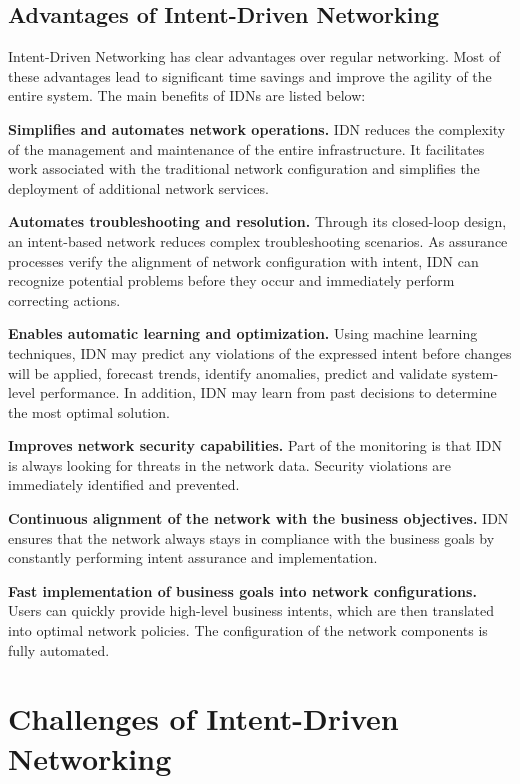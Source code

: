 \subsection{Advantages of Intent-Driven Networking}

Intent-Driven Networking has clear advantages over regular networking. Most of these advantages lead to significant time savings and improve the agility of the entire system\cite{Kolibri}. The main benefits of IDNs are listed below:\cite[11]{MartinezJulia2022}

\textbf{Simplifies and automates network operations.} IDN reduces the complexity of the management and maintenance of the entire infrastructure. It facilitates work associated with the traditional network configuration and simplifies the deployment of additional network services.

\textbf{Automates troubleshooting and resolution.} Through its closed-loop design, an intent-based network reduces complex troubleshooting scenarios. As assurance processes verify the alignment of network configuration with intent, IDN can recognize potential problems before they occur and immediately perform correcting actions.

\textbf{Enables automatic learning and optimization.} Using machine learning techniques, IDN may predict any violations of the expressed intent before changes will be applied, forecast trends, identify anomalies, predict and validate system-level performance. In addition, IDN may learn from past decisions to determine the most optimal solution.

\textbf{Improves network security capabilities.} Part of the monitoring is that IDN is always looking for threats in the network data. Security violations are immediately identified and prevented.

\textbf{Continuous alignment of the network with the business objectives.} IDN ensures that the network always stays in compliance with the business goals by constantly performing intent assurance and implementation.

\textbf{Fast implementation of business goals into network configurations.} Users can quickly provide high-level business intents, which are then translated into optimal network policies. The configuration of the network components is fully automated.



\section{Challenges of Intent-Driven Networking}

